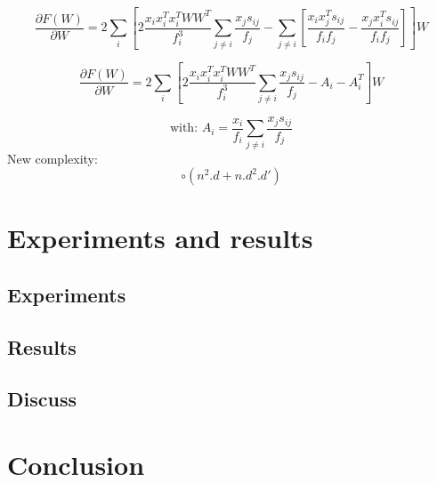 \documentclass{techrep} %
\begin{document}
$$\frac{\partial{F(W)}}{\partial{W}} =
2\sum_{i}\left[2\frac{x_ix_i^Tx_i^TWW^T}{f_i^3}\sum_{j\neq{}i}\frac{x_js_{ij}}{f_j}
  - \sum_{j\neq{}i}\left[\frac{x_ix_j^Ts_{ij}}{f_if_j} - \frac{x_jx_i^Ts_{ij}}{f_if_j}\right]\right]W$$

$$\frac{\partial{F(W)}}{\partial{W}} =
2\sum_{i}\left[2\frac{x_ix_i^Tx_i^TWW^T}{f_i^3}\sum_{j\neq{}i}\frac{x_js_{ij}}{f_j}
  - A_i - A_i^T\right]W$$

$$\text{with: } A_i = \frac{x_i}{f_i}\sum_{j\neq{}i}\frac{x_js_{ij}}{f_j}$$
New complexity: $$\circ{(n^2.d+n.d^2.d')}$$

\chapter{Experiments and results}
\section{Experiments}
\section{Results}
\section{Discuss}
\chapter*{Conclusion}

 \nocite{*}
\end{document}
